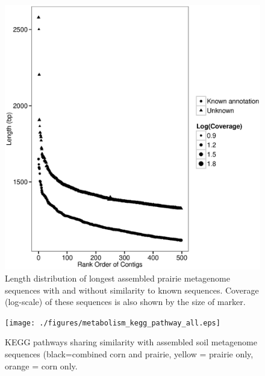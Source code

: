 \documentclass{pnastwo}
\begin{document}
\begin{figure}
\begin{center}
\centerline{\includegraphics[width=.7\textwidth]{./figures/prairie-cov-len-500.eps}}
\caption{Length distribution of longest assembled prairie metagenome sequences with and without similarity to known sequences.  Coverage (log-scale) of these sequences is also shown by the size of marker. }
\label{prairielength}
\end{center}
\end{figure}


\begin{figure}
\begin{center}
\centerline{\texttt{[image: ./figures/metabolism\_kegg\_pathway\_all.eps]}}
\caption{KEGG pathways sharing similarity with assembled soil metagenome sequences (black=combined corn and prairie, yellow = prairie only, orange = corn only.}
\label{kegg}
\end{center}
\end{figure}


\end{document}
